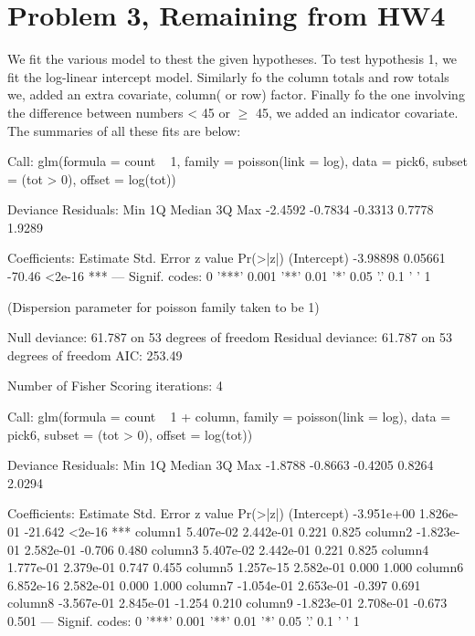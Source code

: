 \documentclass{article}
\begin{document}
\section{Problem 3, Remaining from HW4}
We fit the various model to thest the given hypotheses. To test hypothesis 1, we fit the log-linear intercept model. Similarly fo the column totals and row totals we, added an extra covariate, column( or row) factor. Finally fo the one involving the difference between numbers < 45 or $\geq$ 45, we added an indicator covariate. The summaries of all these fits are below:


\begin{Schunk}
\begin{Soutput}
Call:
glm(formula = count ~ 1, family = poisson(link = log), data = pick6, 
    subset = (tot > 0), offset = log(tot))

Deviance Residuals: 
    Min       1Q   Median       3Q      Max  
-2.4592  -0.7834  -0.3313   0.7778   1.9289  

Coefficients:
            Estimate Std. Error z value Pr(>|z|)    
(Intercept) -3.98898    0.05661  -70.46   <2e-16 ***
---
Signif. codes:  0 '***' 0.001 '**' 0.01 '*' 0.05 '.' 0.1 ' ' 1

(Dispersion parameter for poisson family taken to be 1)

    Null deviance: 61.787  on 53  degrees of freedom
Residual deviance: 61.787  on 53  degrees of freedom
AIC: 253.49

Number of Fisher Scoring iterations: 4
\end{Soutput}
\begin{Soutput}
Call:
glm(formula = count ~ 1 + column, family = poisson(link = log), 
    data = pick6, subset = (tot > 0), offset = log(tot))

Deviance Residuals: 
    Min       1Q   Median       3Q      Max  
-1.8788  -0.8663  -0.4205   0.8264   2.0294  

Coefficients:
              Estimate Std. Error z value Pr(>|z|)    
(Intercept) -3.951e+00  1.826e-01 -21.642   <2e-16 ***
column1      5.407e-02  2.442e-01   0.221    0.825    
column2     -1.823e-01  2.582e-01  -0.706    0.480    
column3      5.407e-02  2.442e-01   0.221    0.825    
column4      1.777e-01  2.379e-01   0.747    0.455    
column5      1.257e-15  2.582e-01   0.000    1.000    
column6      6.852e-16  2.582e-01   0.000    1.000    
column7     -1.054e-01  2.653e-01  -0.397    0.691    
column8     -3.567e-01  2.845e-01  -1.254    0.210    
column9     -1.823e-01  2.708e-01  -0.673    0.501    
---
Signif. codes:  0 '***' 0.001 '**' 0.01 '*' 0.05 '.' 0.1 ' ' 1


\end{Soutput}
\end{Schunk}
\end{document}

